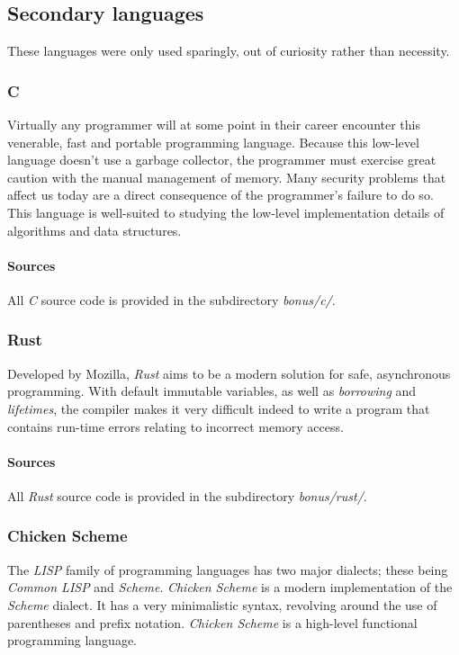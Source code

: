 \documentclass{article}
\begin{document}
\subsection{Secondary languages}
These languages were only used sparingly, out of curiosity rather than necessity.

\subsubsection{C}
Virtually any programmer will at some point in their career encounter this venerable, fast and portable programming
language. Because this low-level language doesn't use a garbage collector, the programmer must exercise great caution
with the manual management of memory. Many security problems that affect us today are a direct consequence of the
programmer's failure to do so. This language is well-suited to studying the low-level implementation details of
algorithms and data structures.

\paragraph{Sources}
All {\em C} source code is provided in the subdirectory {\em bonus/c/}.

\subsubsection{Rust}
Developed by Mozilla, {\em Rust} aims to be a modern solution for safe, asynchronous programming.
With default immutable variables, as well as {\em borrowing} and {\em lifetimes}, the compiler makes it very
difficult indeed to write a program that contains run-time errors relating to incorrect memory access.

\paragraph{Sources}
All {\em Rust} source code is provided in the subdirectory {\em bonus/rust/}.

\subsubsection{Chicken Scheme}
The {\em LISP} family of programming languages has two major dialects; these being {\em Common LISP} and {\em Scheme}.
{\em Chicken Scheme} is a modern implementation of the {\em Scheme} dialect. It has a very minimalistic syntax,
revolving around the use of parentheses and prefix notation. {\em Chicken Scheme} is a high-level functional
programming language.
\end{document}
